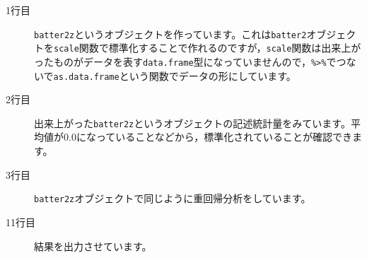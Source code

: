\begin{description}
	\item[1行目]\texttt{batter2z}というオブジェクトを作っています。これは\texttt{batter2}オブジェクトを\verb|scale|関数で標準化することで作れるのですが，\verb|scale|関数は出来上がったものがデータを表す\texttt{data.frame}型になっていませんので，\verb|%>%|でつないで\verb|as.data.frame|という関数でデータの形にしています。
	\item[2行目] 出来上がった\texttt{batter2z}というオブジェクトの記述統計量をみています。平均値が0.0になっていることなどから，標準化されていることが確認できます。
	\item[3行目]  \texttt{batter2z}オブジェクトで同じように重回帰分析をしています。
	\item[11行目] 結果を出力させています。
\end{description}
